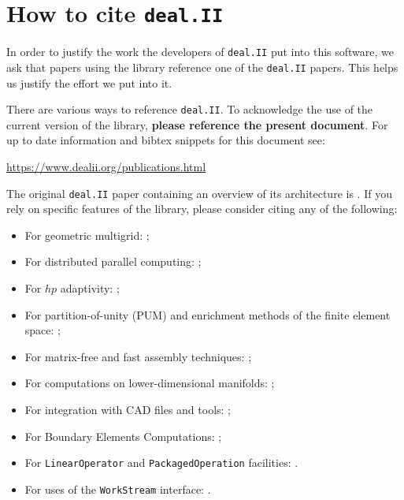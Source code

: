 \documentclass{ansarticle-preprint}
\newcommand{\specialword}[1]{\texttt{#1}}
\newcommand{\dealii}{{\specialword{deal.II}}\xspace}
\begin{document}
\section{How to cite \dealii}\label{sec:cite}

In order to justify the work the developers of \dealii put into this
software, we ask that papers using the library reference one of the
\dealii papers. This helps us justify the effort we put into it.

There are various ways to reference \dealii. To acknowledge the use of
the current version of the library, \textbf{please reference the present
document}. For up to date information and bibtex snippets for this document
see:
\begin{center}
 \url{https://www.dealii.org/publications.html}
\end{center}

The original \texttt{\dealii} paper containing an overview of its
architecture is \cite{BangerthHartmannKanschat2007}. If you rely on
specific features of the library, please consider citing any of the
following:
\begin{itemize}
 \item For geometric multigrid: \cite{Kanschat2004,JanssenKanschat2011};
 \item For distributed parallel computing: \cite{BangerthBursteddeHeisterKronbichler11};
 \item For $hp$ adaptivity: \cite{BangerthKayserHerold2007};
  \item For partition-of-unity (PUM) and enrichment methods of the
    finite element space: \cite{Davydov2016};
 \item For matrix-free and fast assembly techniques:
   \cite{KronbichlerKormann2012};
 \item For computations on lower-dimensional manifolds:
   \cite{DeSimoneHeltaiManigrasso2009};
 \item For integration with CAD files and tools:
   \cite{HeltaiMola2015};
 \item For Boundary Elements Computations:
   \cite{GiulianiMolaHeltai-2018-a};
 \item For \texttt{LinearOperator} and \texttt{PackagedOperation} facilities:
   \cite{MaierBardelloniHeltai-2016-a,MaierBardelloniHeltai-2016-b}.
 \item For uses of the \texttt{WorkStream} interface:
   \cite{TKB16}.
\end{itemize}
\end{document}
